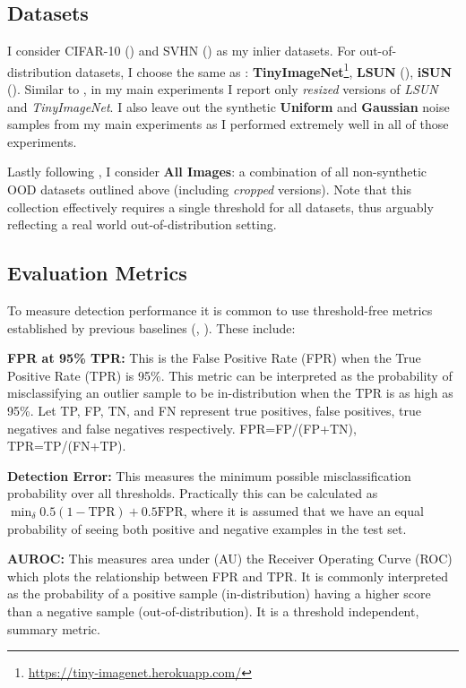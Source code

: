 \subsection*{Datasets}
\label{datasets}
I consider CIFAR-10 (\cite{Krizhevsky2009learning}) and SVHN (\cite{Netzer2011reading}) as my inlier datasets. For out-of-distribution datasets, I choose the same as \cite{Liang2017}: \textbf{TinyImageNet}\footnote{\url{https://tiny-imagenet.herokuapp.com/}}, \textbf{LSUN} (\cite{Yu2015lsun}), \textbf{iSUN} (\cite{Xu2015turkergaze}). Similar to \cite{Devries}, in my main experiments I report only \textit{resized} versions of \textit{LSUN} and \textit{TinyImageNet}. I also leave out the synthetic \textbf{Uniform} and \textbf{Gaussian} noise samples from my main experiments as I performed extremely well in all of those experiments.

Lastly following \cite{Devries}, I consider \textbf{All Images}: a combination of all non-synthetic OOD datasets outlined above (including \textit{cropped} versions). Note that this collection effectively requires a single threshold for all datasets, thus arguably reflecting a real world out-of-distribution setting.

\subsection*{Evaluation Metrics}

To measure detection performance it is common to use threshold-free metrics established by previous baselines (\cite{Hendrycks2019}, \cite{Liang2017}). These include:

\textbf{FPR at 95\% TPR:} This is the False Positive Rate (FPR) when the True Positive Rate (TPR) is 95\%. This metric can be interpreted as the probability of misclassifying an outlier sample to be in-distribution when the TPR is as high as 95\%. Let TP, FP, TN, and FN represent true positives, false positives, true negatives and false negatives respectively. FPR=FP/(FP+TN), TPR=TP/(FN+TP).

\textbf{Detection Error:} This measures the minimum possible misclassification probability over all thresholds. Practically this can be calculated as $\min_{\delta} 0.5(1-\text{TPR}) + 0.5\text{FPR}$, where it is assumed that we have an equal probability of seeing both positive and negative examples in the test set.

\textbf{AUROC:} This measures area under (AU) the Receiver Operating Curve (ROC) which plots the relationship between FPR and TPR. It is commonly interpreted as the probability of a positive sample (in-distribution) having a higher score than a negative sample (out-of-distribution). It is a threshold independent, summary metric.

